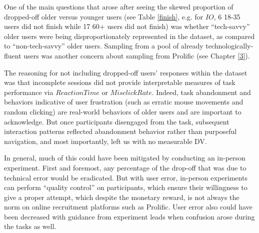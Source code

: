 \documentclass[12pt,twoside]{reedthesis}
\begin{document}
    One of the main questions that arose after seeing the skewed proportion of dropped-off older versus younger users (see Table \ref{finish}, e.g. for $IO$, 6 18-35 users did not finish while 17 60+ users did not finish) was whether \enquote{tech-savvy} older users were being disproportionately represented in the dataset, as compared to \enquote{non-tech-savvy} older users. Sampling from a pool of already technologically-fluent users was another concern about sampling from Prolific (see Chapter \ref{3}).


    The reasoning for not including dropped-off users' responses within the dataset was that incomplete sessions did not provide interpretable measures of task performance via $ReactionTime$ or $MisclickRate$. Indeed, task abandonment and behaviors indicative of user frustration (such as erratic mouse movements and random clicking) \cite{mahmud_learning_2020} are real-world behaviors of older users and are important to acknowledge. But once participants disengaged from the task, subsequent interaction patterns reflected abandonment behavior rather than purposeful navigation, and most importantly, left us with no measurable DV.
    
    In general, much of this could have been mitigated by conducting an in-person experiment. First and foremost, any percentage of the drop-off that was due to technical error would be eradicated. But with user error, in-person experiments can perform \enquote{quality control} on participants, which ensure their willingness to give a proper attempt, which despite the monetary reward, is not always the norm on online recruitment platforms such as Prolific. User error also could have been decreased with guidance from experiment leads when confusion arose during the tasks as well.
\end{document}
